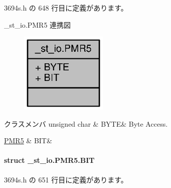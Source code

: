  3694s.\+h の 648 行目に定義があります。



\+\_\+st\+\_\+io.\+P\+M\+R5 連携図
\nopagebreak
\begin{figure}[H]
\begin{center}
\leavevmode
\includegraphics[width=118pt]{d2/d89/union__st__io_8PMR5__coll__graph}
\end{center}
\end{figure}
\begin{DoxyFields}{クラスメンバ}
unsigned char\label{3694s_8h_ae409eb2ba6eb6801f52763ae370c350e}
&
B\+Y\+T\+E&
Byte Access. \\
\hline

\hyperlink{3694s_8h_d1/d5e/struct__st__io_8PMR5_8BIT}{P\+M\+R5}\label{3694s_8h_adb957fdc8000e1eef04a243f5199aa52}
&
B\+I\+T&
\\
\hline

\end{DoxyFields}
\label{struct__st__io_8PMR5_8BIT}
\paragraph{struct \+\_\+st\+\_\+io.\+P\+M\+R5.\+B\+I\+T}


 3694s.\+h の 651 行目に定義があります。



